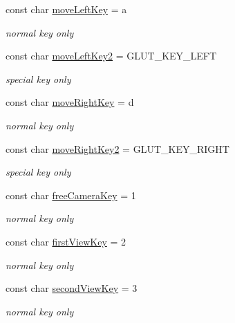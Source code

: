 \begin{DoxyCompactItemize}
const char \mbox{\hyperlink{namespacekrizpav6_a651dbd85da2f6308c50087734ddb66d4}{move\+Left\+Key}} = \textquotesingle{}a\textquotesingle{}
\begin{DoxyCompactList}\small\item\em normal key only \end{DoxyCompactList}\item 
const char \mbox{\hyperlink{namespacekrizpav6_a5f59a15014e49aead3c2c2949c6c35c2}{move\+Left\+Key2}} = G\+L\+U\+T\+\_\+\+K\+E\+Y\+\_\+\+L\+E\+FT
\begin{DoxyCompactList}\small\item\em special key only \end{DoxyCompactList}\item 
const char \mbox{\hyperlink{namespacekrizpav6_a3147174db24345f76955dd666cf94991}{move\+Right\+Key}} = \textquotesingle{}d\textquotesingle{}
\begin{DoxyCompactList}\small\item\em normal key only \end{DoxyCompactList}\item 
const char \mbox{\hyperlink{namespacekrizpav6_a3e77a9228006135a04b435c77178af26}{move\+Right\+Key2}} = G\+L\+U\+T\+\_\+\+K\+E\+Y\+\_\+\+R\+I\+G\+HT
\begin{DoxyCompactList}\small\item\em special key only \end{DoxyCompactList}\item 
const char \mbox{\hyperlink{namespacekrizpav6_a6da036bf12a0083d00955577300e1b17}{free\+Camera\+Key}} = \textquotesingle{}1\textquotesingle{}
\begin{DoxyCompactList}\small\item\em normal key only \end{DoxyCompactList}\item 
const char \mbox{\hyperlink{namespacekrizpav6_af56fde22fb7f76af98ad64308d0c5be4}{first\+View\+Key}} = \textquotesingle{}2\textquotesingle{}
\begin{DoxyCompactList}\small\item\em normal key only \end{DoxyCompactList}\item 
const char \mbox{\hyperlink{namespacekrizpav6_a8b32ae658845e7457189efe25826c6da}{second\+View\+Key}} = \textquotesingle{}3\textquotesingle{}
\begin{DoxyCompactList}\small\item\em normal key only \end{DoxyCompactList}\item 

\end{DoxyCompactItemize}
